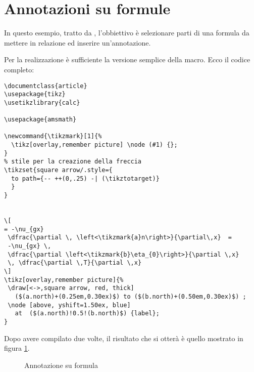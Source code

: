 \section{Annotazioni su formule}

In questo esempio, tratto da , l'obbiettivo è selezionare parti di una formula da mettere in relazione ed inserire un'annotazione.

Per la realizzazione è sufficiente la versione semplice della  macro. Ecco il codice completo:
\begin{lstlisting}[frame=lines]
\documentclass{article}
\usepackage{tikz}
\usetikzlibrary{calc}

\usepackage{amsmath}   

\newcommand{\tikzmark}[1]{%
  \tikz[overlay,remember picture] \node (#1) {};
}
% stile per la creazione della freccia 
\tikzset{square arrow/.style={
  to path={-- ++(0,.25) -| (\tikztotarget)}
  }
}


\[
= -\nu_{gx}  
 \dfrac{\partial \, \left<\tikzmark{a}n\right>}{\partial\,x}  =
 -\nu_{gx} \, 
 \dfrac{\partial \left<\tikzmark{b}\eta_{0}\right>}{\partial \,x} 
 \, \dfrac{\partial \,T}{\partial \,x}
\]
\tikz[overlay,remember picture]{%
 \draw[<->,square arrow, red, thick] 
   ($(a.north)+(0.25em,0.30ex)$) to ($(b.north)+(0.50em,0.30ex)$) ;
 \node [above, yshift=1.50ex, blue] 
   at  ($(a.north)!0.5!(b.north)$) {label};
}

\end{lstlisting}

Dopo avere compilato due volte, il risultato che si otterà è quello mostrato in figura \ref{fig:annotaformula}.

\begin{figure}[ht]
\centering
{}
\caption{Annotazione su formula}
\label{fig:annotaformula}
\end{figure}

